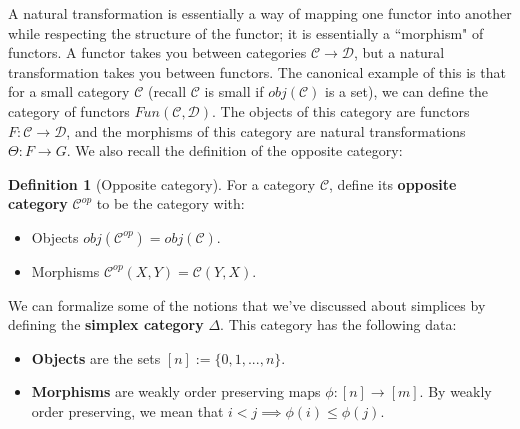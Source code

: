 \documentclass[11pt, oneside]{amsart}   	%
\theoremstyle{definition}
\newtheorem{definition}{Definition}[section]
\begin{document}
A natural transformation is essentially a way of mapping one functor into another while respecting the structure of the functor; 
it is essentially a ``morphism" of functors. A functor takes you between categories $\mathcal C\rightarrow\mathcal D$, but 
a natural transformation takes you between functors. The canonical example of this is that for a small category $\mathcal C$ 
(recall $\mathcal C$ is small if $obj(\mathcal C)$ is a set), we can define the category of functors $Fun(\mathcal C, 
\mathcal D)$. The objects of this category are functors $F : \mathcal C\rightarrow\mathcal D$, and the morphisms of this 
category are natural transformations $\Theta : F\rightarrow G$. We also recall the definition of the opposite category:

\begin{definition}[Opposite category]
	For a category $\mathcal C$, define its \textbf{opposite category} $\mathcal C^{op}$ to be the category with:
	\begin{itemize}
		\item Objects $obj(\mathcal C^{op}) = obj(\mathcal C)$. 
		\item Morphisms $\mathcal C^{op}(X, Y) = \mathcal C(Y, X)$. 
	\end{itemize}
\end{definition}

We can formalize some of the notions that we've discussed about simplices by defining the \textbf{simplex category} $\Delta$. 
This category has the following data:
\begin{itemize}
	\item \textbf{Objects} are the sets $[n] := \{0, 1, ..., n\}$. 
	\item \textbf{Morphisms} are weakly order preserving maps $\phi : [n]\rightarrow [m]$. By weakly order preserving, we 
	mean that $i < j\implies \phi(i)\leq\phi(j)$. 
\end{itemize}
\end{document}

